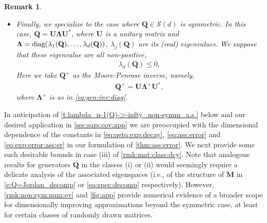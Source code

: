 \documentclass[9pt,twocolumn,twoside]{pnas-new}
\newtheorem{Remark}[Theorem]{Remark}
\newcommand{\?}{\textbf{?}}
\newcommand{\diag}{\textnormal{diag}}
\newcommand{\QQ}{\mathbf{Q}}
\newcommand{\LLambda}{\boldsymbol{\Lambda}}
\newcommand{\M}{\mathbf{M}}
\newcommand{\UU}{\mathbf{U}}
\begin{document}
\begin{Remark}
\begin{itemize}
\begin{align}
      \end{align}
    The complex numbers $\lambda_j(\QQ)^+$,
    $j = 1, \ldots, d$ are defined as in \eqref{eq:eig:gen:inv}.
  \item[(iii)] Finally, we specialize to the case where
    $\QQ \in \mathcal{S}(d)$ is symmetric. In this case,
    $\QQ = \UU \LLambda \UU^*$, where $\UU$ is a unitary matrix and
    $\LLambda = \diag (\lambda_1(\QQ), \ldots ,\lambda_d(\QQ))$,
    $\lambda_j(\QQ)$ are its (real) eigenvalues.  We suppose that
    these eigenvalue are all non-positive,
    \begin{align}\label{eq:ev:d:cond:sym:case}
      \lambda_d({\mathbf Q}) \leq 0,
    \end{align}
    Here we take $\QQ^+$ as the Moore-Penrose inverse, namely,
    \begin{align}\label{eq:MP:inv:sym:case}
      \QQ^+ = \UU \LLambda^+ \UU^*,
   \end{align}
    where $\LLambda^+$ is as in \eqref{eq:gen:inv:diag}.   
  \end{itemize}
\end{Remark}
In anticipation of \cref{t:lambda_n-1(Q)->-infty_non-symm_a.s.} below
and our desired application in \cref{sec:sars:cov:app} we are
preoccupied with the dimensional dependence of the constants in
\eqref{eq:qetq:exp:decay}, \eqref{eq:ass:error}
and \eqref{eq:exp:error:ass:er} in our formulation of
\cref{thm:ass:error}.  We next provide some such desirable bounds in
case (iii) of \cref{rmk:mat:class:dcy}.  Note that analogous results
for generators $\QQ$ in the classes (i) or (ii) would seemingly
require a delicate analysis of the associated eigenspaces (i.e., of the
structure of $\M$ in \eqref{e:Q=Jordan_decomp} or
\eqref{eq:spec:decomp} respectively).  However,
\cref{rmk:non:sym:num:ev} and \cref{fig:app} provide numerical evidence
of a broader scope for dimensionally improving approximations beyond
the symmetric case, at least for certain classes of randomly drawn
matrices.
\end{document}

